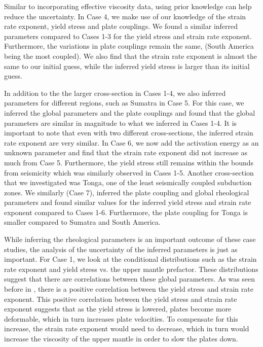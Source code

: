 \documentclass[12pt]{article}
\begin{document}
Similar to incorporating effective viscosity data, using prior knowledge can help reduce the uncertainty. In Case 4, we make use of our knowledge of the strain rate exponent, yield stress and plate couplings. We found a similar inferred parameters compared to Cases 1-3 for the yield stress and strain rate exponent. Furthermore, the variations in plate couplings remain the same, (South America being the most coupled). We also find that the strain rate exponent is almost the same to our initial guess, while the inferred yield stress is larger than its initial guess. 

In addition to the the larger cross-section in Cases 1-4, we also inferred parameters for different regions, such as Sumatra in Case 5. For this case, we inferred the global parameters and the plate couplings and found that the global parameters are similar in magnitude to what we inferred in Cases 1-4. It is important to note that even with two different cross-sections, the inferred strain rate exponent are very similar. In Case 6, we now add the activation energy as an unknown parameter and find that the strain rate exponent did not increase as much from Case 5. Furthermore, the yield stress still remains within the bounds from seismicity which was similarly observed in Cases 1-5. Another cross-section that we investigated was Tonga, one of the least seismically coupled subduction zones. We similarly (Case 7), inferred the plate coupling and global rheological parameters and found similar values for the inferred yield stress and strain rate exponent compared to Cases 1-6. Furthermore, the plate coupling for Tonga is smaller compared to Sumatra and South America. 

While inferring the rheological parameters is an important outcome of these case studies, the analysis of the uncertainty of the inferred parameters is just as important. 
For Case 1, we look at the conditional distributions such as the strain rate exponent and yield stress vs. the upper mantle prefactor. These distributions suggest that there are correlations between these global parameters. As was seen before in \citep{ratnaswamy2015adjoint}, there is a positive correlation between the yield stress and strain rate exponent. This positive correlation between the yield stress and strain rate exponent suggests that as the yield stress is lowered, plates become more deformable, which in turn increases plate velocities. To compensate for this increase, the strain rate exponent would need to decrease, which in turn would increase the viscosity of the upper mantle in order to slow the plates down. 
\end{document}
